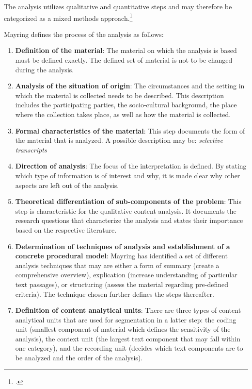 The analysis utilizes qualitative and quantitative steps and may therefore be categorized as a mixed methods approach.\footcite[Cf.][p.10]{MayringQualitativeContentAnalysis2014}

Mayring defines the process of the analysis 
as follows: 
\begin{enumerate}
    \item \textbf{Definition of the material}: The material on which the analysis is based must be defined exactly. The defined set of material is not to be changed during the analysis.
    \item \textbf{Analysis of the situation of origin}: The circumstances and the setting in which the material is collected needs to be described. This description includes the participating parties, the socio-cultural background, the place where the collection takes place, as well as how the material is collected.
    \item \textbf{Formal characteristics of the material}: This step documents the form of the material that is analyzed. A possible description may be: \textit{selective transcripts}
    \item \textbf{Direction of analysis}: The focus of the interpretation is defined. By stating which type of information is of interest and why, it is made clear why other aspects are left out of the analysis.
    \item \textbf{Theoretical differentiation of sub-components of the problem}: This step is characteristic for the qualitative content analysis. It documents the research questions that characterize the analysis and states their importance based on the respective literature.
    \item \textbf{Determination of techniques of analysis and establishment of a concrete procedural model}: Mayring has identified a set of different analysis techniques that may are either a form of summary (create a comprehensive overview), explication (increase understanding of particular text passages), or structuring (assess the material regarding pre-defined criteria). The technique chosen further defines the steps thereafter.
    \item \textbf{Definition of content analytical units}: There are three types of content analytical units that are used for segmentation in a latter step: the coding unit (smallest component of material which defines the sensitivity of the analysis), the context unit (the largest text component that may fall within one category), and the recording unit (decides which text components are to be analyzed and the order of the analysis).

\end{enumerate}
